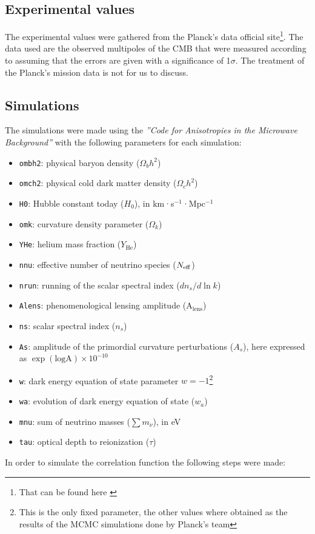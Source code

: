 \documentclass{article}
\begin{document}
\subsection{Experimental values}
The experimental values were gathered from the Planck's data official site\footnote{That can be found here \autocite{planck_legacy_archive}}. The data used are the observed multipoles of the CMB that were measured according to \autocite{cosmoplanck_2020} assuming that the errors are given with a significance of 1$\sigma$. The treatment of the Planck's mission data is not for us to discuss.

\subsection{Simulations}

The simulations were made using the \textit{''Code for Anisotropies in the Microwave Background''} \autocite{CAMB_GitHub} with the following parameters for each simulation:
\begin{itemize}
  \item \texttt{ombh2}: physical baryon density (\(\Omega_b h^2\))
  \item \texttt{omch2}: physical cold dark matter density (\(\Omega_c h^2\))
  \item \texttt{H0}: Hubble constant today (\(H_0\)), in km·s\(^{-1}\)·Mpc\(^{-1}\)
  \item \texttt{omk}: curvature density parameter (\(\Omega_k\))
  \item \texttt{YHe}: helium mass fraction (\(Y_\mathrm{He}\))
  \item \texttt{nnu}: effective number of neutrino species (\(N_{\rm eff}\))
  \item \texttt{nrun}: running of the scalar spectral index (\(dn_s/d\ln k\))
  \item \texttt{Alens}: phenomenological lensing amplitude (A\(_\mathrm{lens}\))
  \item \texttt{ns}: scalar spectral index (\(n_s\))
  \item \texttt{As}: amplitude of the primordial curvature perturbations (\(A_s\)), here expressed as \(\exp(\text{logA})\times10^{-10}\)
  \item \texttt{w}: dark energy equation of state parameter \(w=-1\)\footnote{This is the only fixed parameter, the other values where obtained as the results of the MCMC simulations done by Planck's team}
  \item \texttt{wa}: evolution of dark energy equation of state (\(w_a\))
  \item \texttt{mnu}: sum of neutrino masses (\(\sum m_\nu\)), in eV
  \item \texttt{tau}: optical depth to reionization (\(\tau\))
\end{itemize}
In order to simulate the correlation function the following steps were made:
\end{document}
